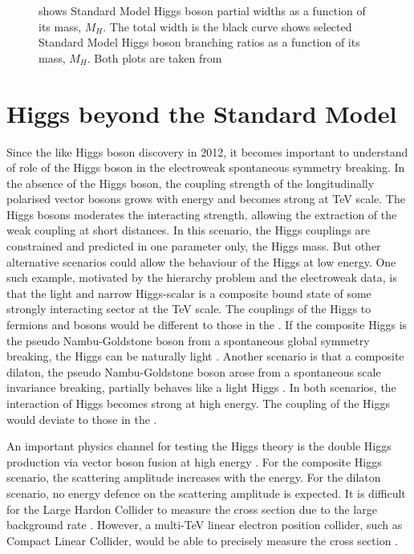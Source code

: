 \begin{figure}[tbph]
\begin{subfigure}[b]{0.45\textwidth}
        \caption{}
        \label{fig:theoryHiggsBranchingRatio}
    \end{subfigure}
\caption[]
{ shows Standard Model Higgs boson partial widths as a function of its mass, $M_H$. The total width is the black curve  shows selected Standard Model Higgs boson branching ratios as a function of its mass, $M_H$. Both plots are taken from \cite{Rainwater:2007cp} }
\label{fig:theoryHiggsPhenomenology}
\end{figure}


\section{Higgs beyond the Standard Model}


Since the \SM like Higgs boson discovery in 2012, it becomes important to understand of role of the Higgs boson in the electroweak spontaneous symmetry breaking. In the absence of the Higgs boson, the coupling strength of the longitudinally polarised vector bosons grows with energy and becomes strong at TeV scale. The \SM Higgs bosons moderates the interacting strength, allowing the extraction of the weak coupling at short distances. In this scenario, the \SM Higgs couplings are constrained and predicted in one parameter only, the Higgs mass. But other alternative scenarios could allow the behaviour of the \SM Higgs at low energy. One such example, motivated by the hierarchy problem and the electroweak data, is that the light and narrow Higgs-scalar is a composite bound state of some strongly interacting sector at the TeV scale. The couplings of the Higgs to fermions and bosons would be different to those in the \SM. If the composite Higgs is the pseudo Nambu-Goldstone boson from a spontaneous global symmetry breaking, the Higgs can be naturally light \cite{Kaplan:1983fs}. Another scenario is that a composite dilaton, the pseudo Nambu-Goldstone boson arose from a spontaneous scale invariance breaking, partially behaves like a light Higgs \cite{Goldberger:2008zz}. In both scenarios, the interaction of Higgs becomes strong at high energy. The coupling of the Higgs would deviate to those in the \SM.

An important physics channel for testing the Higgs theory is the double Higgs production via vector boson fusion at high energy \cite{Giudice:2007fh,Contino:2010mh,Contino:2013gna}. For the composite Higgs scenario, the scattering amplitude increases with the energy. For the dilaton scenario, no energy defence on the scattering amplitude is expected. It is difficult for the Large Hardon Collider to measure the cross section due to the large \SM background rate \cite{Contino:2010mh}. However, a multi-TeV linear electron position collider, such as Compact Linear Collider, would be able to precisely measure the cross section \cite{Barger:2003rs}.

